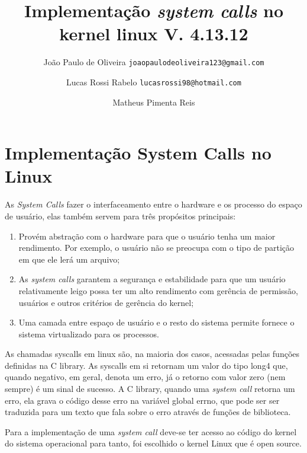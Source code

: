 \documentclass[12pt]{article}
\begin{document}
\title{Implementação \textit{system calls} no kernel linux V. 4.13.12\vspace{3.5cm}} %

\author{
	João Paulo de Oliveira
	\texttt{joaopaulodeoliveira123@gmail.com}
	\and
	Lucas Rossi Rabelo
	\texttt{lucasrossi98@hotmail.com}
	\and		
	Matheus Pimenta Reis
	\texttt{}
	\vspace*{9cm}
}

\maketitle
\tableofcontents

\pagebreak
\section*{Implementação \textbf{System Calls} no Linux}
As \textit{System Calls} fazer o interfaceamento entre o hardware e os processo do espaço de usuário, elas também servem para três propósitos principais:
\begin{enumerate}
	\item Provém abstração com o hardware para que o usuário tenha um maior rendimento. Por exemplo, o usuário não se preocupa com o tipo de partição em que ele lerá um arquivo;
	\item As \textit{system calls} garantem a segurança e estabilidade para que um usuário relativamente leigo possa ter um alto rendimento com gerência de permissão, usuários e outros critérios de gerência do kernel;
	\item Uma camada entre espaço de usuário e o resto do sistema permite fornece o sistema virtualizado para os processos.
\end{enumerate}
	As chamadas syscalls em linux são, na maioria dos casos, acessadas pelas funções definidas na C library. As syscalls em si retornam um valor do tipo long4 que, quando negativo, em geral, denota um erro, já o retorno com valor zero (nem sempre) é um sinal de sucesso. A C library, quando uma \textit{system call} retorna um erro, ela grava o código desse erro na variável global errno, que pode ser ser traduzida para um texto que fala sobre o erro através de funções de biblioteca.
	
	Para a implementação de uma \textit{system call} deve-se ter acesso ao código do kernel do sistema operacional para tanto, foi escolhido o kernel Linux que é open source.
\end{document}
